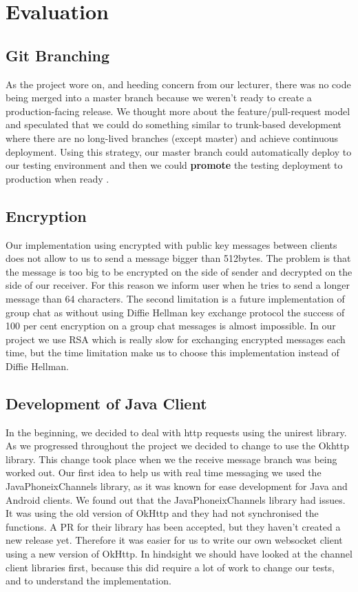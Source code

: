 \documentclass[11pt,a4paper]{report}
\begin{document}
\chapter{Evaluation}



\section{Git Branching}
As the project wore on, and heeding concern from our lecturer, there was no code being merged into a master branch because we weren't ready to create a production-facing release. We thought more about the feature/pull-request model and speculated that we could do something similar to trunk-based development where there are no long-lived branches (except master) and achieve continuous deployment. Using this strategy, our master branch could automatically deploy to our testing environment and then we could \textbf{promote} the testing deployment to production when ready \cite{website:thoughtworks_trunk_based_development}.

\section{Encryption}
Our implementation using encrypted with public key messages between clients does not allow to us to send a message bigger than 512bytes. The problem is that the message is too big to be encrypted on the side of sender and decrypted on the side of our receiver. For this reason we inform user when he tries to send a longer message than 64 characters. The second limitation is a future implementation of group chat as without using  Diffie Hellman key exchange protocol the success of 100 per cent encryption on a group chat messages is almost impossible. In our project we use RSA which is really slow for exchanging encrypted messages each time, but the time limitation make us to choose this implementation instead of Diffie Hellman.

\section{Development of Java Client}
In the beginning, we decided to deal with http requests using the unirest library. As we progressed throughout the project we decided to change to use the Okhttp library. This change took place when we the receive message branch was being worked out. Our first idea to help us with real time messaging we used the JavaPhoneixChannels library, as it was known for ease development for Java and Android clients. We found out that the JavaPhoneixChannels library had issues. It was using the old version of OkHttp and they had not synchronised the functions. A PR for their library has been accepted, but they haven’t created a new release yet. Therefore it was easier for us to write our own websocket client using a new version of OkHttp. In hindsight we should have looked at the channel client libraries first, because this did require a lot of work to change our tests, and to understand the implementation.
\end{document}
